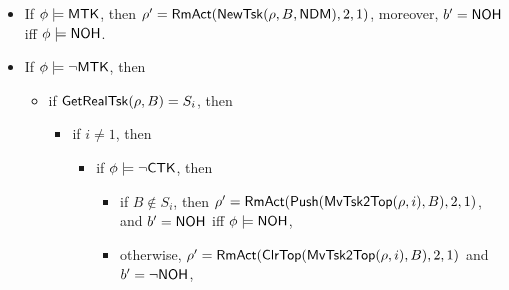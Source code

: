 {\begin{itemize}
    \item If $\phi \models {\sf MTK}$, then $\rho'= \mathsf{RmAct}(\mathsf{NewTsk}(\rho, B, {\sf NDM}), 2, 1)$, moreover, $b' = {\sf NOH}$ iff $\phi  \models {\sf NOH}$.
    \item If $\phi \models \neg {\sf MTK}$, then
   \begin{itemize}
        \item if $\mathsf{GetRealTsk}(\rho, B) = S_i$, then
	\begin{itemize}
		\item if $i \neq 1$, then
        			\begin{itemize}
            			\item if $\phi \models \neg {\sf CTK}$, then 
				\begin{itemize}
					\item if $B \not \in S_i$, then $\rho' = \mathsf{RmAct}(\mathsf{Push}(\mathsf{MvTsk2Top}(\rho, i), B), 2, 1)$, and $b' = {\sf NOH}$ iff $\phi  \models {\sf NOH}$, 
					\item otherwise, $\rho'= \mathsf{RmAct}(\mathsf{ClrTop}(\mathsf{MvTsk2Top}(\rho, i), B), 2, 1)$ and $b' = \neg {\sf NOH}$,

\end{itemize}
\end{itemize}
\end{itemize}
\end{itemize}
\end{itemize}}
